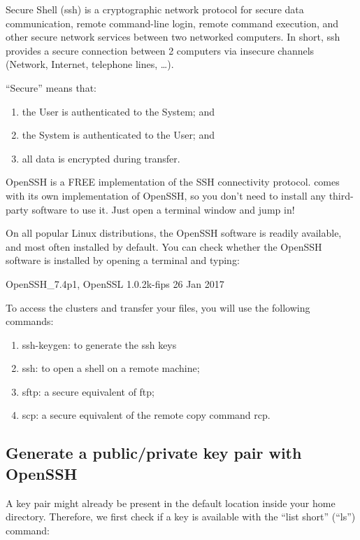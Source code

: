   Secure Shell (ssh) is a cryptographic network protocol for secure data
  communication, remote command-line login, remote command execution, and other
  secure network services between two networked computers. In short, ssh
  provides a secure connection between 2 computers via insecure channels
  (Network, Internet, telephone lines, \ldots).

  ``Secure'' means that:
  \begin{enumerate}
    \item  the User is authenticated to the System; and
    \item  the System is authenticated to the User; and
    \item  all data is encrypted during transfer.
  \end{enumerate}

  OpenSSH is a FREE implementation of the SSH connectivity protocol. \OS comes
  with its own implementation of OpenSSH, so you don't need to install any
  third-party software to use it. Just open a terminal window and jump in!

  On all popular Linux distributions, the OpenSSH software is readily
  available, and most often installed by default. You can check whether the
  OpenSSH software is installed by opening a terminal and typing:

\begin{prompt}
OpenSSH_7.4p1, OpenSSL 1.0.2k-fips  26 Jan 2017
\end{prompt}

  To access the clusters and transfer your files, you will use the following commands:

  \begin{enumerate}
    \item  ssh-keygen: to generate the ssh keys
    \item  ssh: to open a shell on a remote machine;
    \item  sftp: a secure equivalent of ftp;
    \item  scp: a secure equivalent of the remote copy command rcp.
  \end{enumerate}

  \subsection{Generate a public/private key pair with OpenSSH}
  \label{sec:generate-key-pair-with-openssh}

  A key pair might already be present in the default location inside your home
  directory. Therefore, we first check if a key is available with the ``list
  short'' (``ls'')  command:

